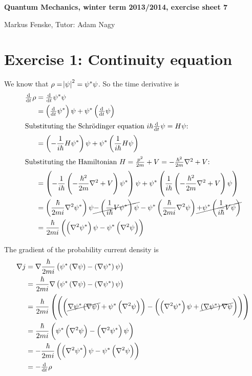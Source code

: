\documentclass[a4paper,german,12pt,smallheadings]{scrartcl}
\begin{document}
\allowdisplaybreaks %
\begin{center}
\bfseries %
\sffamily %
\vspace{-40pt}
Quantum Mechanics, winter term 2013/2014, exercise sheet 7

Markus Fenske, Tutor: Adam Nagy
\vspace{-10pt}
\end{center}

\section*{Exercise 1: Continuity equation}
We know that $\rho = \envert{\psi}^2 = \psi^*\psi$. So the time derivative is
\begin{align*}
  \od{}{t} \rho &= \od{}{t} \psi^*\psi \\
                         &= \del{\od{}{t} \psi^*} \psi + \psi^* \del{\od{}{t} \psi} \\
  \intertext{Substituting the Schrödinger equation $i \hbar \od{}{t} \psi = H \psi$:}
  &= \del{-\frac{1}{i\hbar} H \psi^*} \psi + \psi^* \del{\frac{1}{i \hbar} H \psi} \\
  \intertext{Substituting the Hamiltonian $H = \frac{p^2}{2m} + V = -\frac{\hbar^2}{2m} \nabla^2 + V$:}
  &= \del{-\frac{1}{i\hbar} \del{-\frac{\hbar^2}{2m} \nabla^2 + V} \psi^*} \psi + \psi^* \del{\frac{1}{i \hbar} \del{-\frac{\hbar^2}{2m} \nabla^2 + V} \psi} \\
  &= \del{\frac{\hbar}{2 mi} \nabla^2 \psi^*}\psi \cancel{- \del{\frac{1}{i \hbar} V \psi^*}\psi} - \psi^* \del{\frac{\hbar}{2 mi} \nabla^2 \psi} \cancel{+ \psi^* \del{\frac{1}{i \hbar} V \psi}} \\
  &= \frac{\hbar}{2 mi} \del{\del{\nabla^2 \psi^*}\psi - \psi^* \del{\nabla^2 \psi}}
\end{align*}

The gradient of the probability current density is
\begin{align*}
  \nabla j &= \nabla \frac{\hbar}{2mi} \del{\psi^* \del{\nabla \psi} - \del{\nabla \psi^*} \psi} \\
           &= \frac{\hbar}{2mi} \nabla \del{\psi^* \del{\nabla \psi} - \del{\nabla \psi^*} \psi} \\
           &= \frac{\hbar}{2mi} \del{\del{\del{\cancel{\nabla \psi^* \del{\nabla \psi}} + \psi^* \del{\nabla^2 \psi}} - \del{\del{\nabla^2 \psi^*} \psi + \cancel{\del{\nabla \psi^*} \nabla \psi}}}} \\
           &= \frac{\hbar}{2mi} \del{\psi^* \del{\nabla^2 \psi} - \del{\nabla^2 \psi^*} \psi} \\
           &= -\frac{\hbar}{2mi} \del{\del{\nabla^2 \psi^*}\psi - \psi^* \del{\nabla^2 \psi}} \\
           &= -\od{}{t} \rho
\end{align*}
\end{document}
